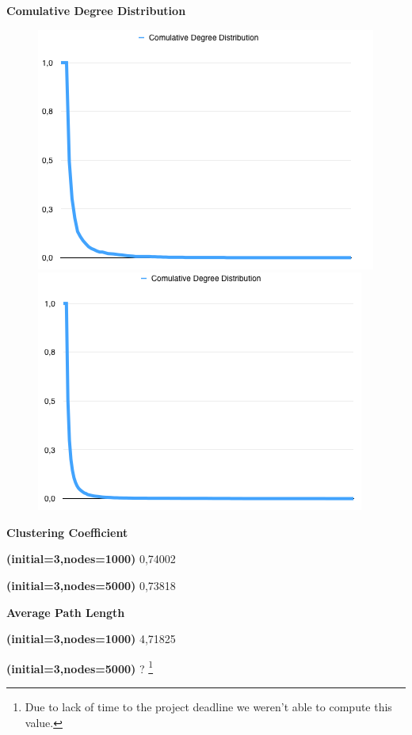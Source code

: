 \documentclass[a4paper,titlepage,11pt]{article}
\begin{document}
\textbf{Comulative Degree Distribution}

\begin{figure}[h]
    \centering
    \includegraphics[scale=0.50]{img/cdd-minimal-3-1000.png}
    \includegraphics[scale=0.50]{img/cdd-minimal-3-5000.png}
\end{figure}

\begin{multicols}{2}

  \textbf{Clustering Coefficient}

  \textbf{(initial=3,nodes=1000)} 0,74002

  \textbf{(initial=3,nodes=5000)} 0,73818

\columnbreak

  \textbf{Average Path Length}

  \textbf{(initial=3,nodes=1000)} 4,71825

  \textbf{(initial=3,nodes=5000)} ? \footnote{Due to lack of time to the project deadline we weren't able to compute this value.}

\end{multicols}
\end{document}

